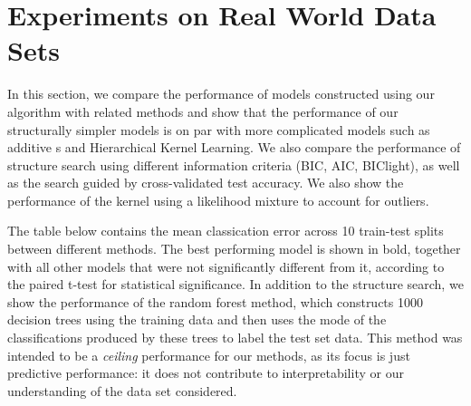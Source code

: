 \documentclass[a4paper,12pt ]{report}
\begin{document}
 \clearpage



\section{Experiments on Real World Data Sets}

In this section, we compare the performance of models constructed using our algorithm with related methods and show that the performance of our structurally simpler models is on par with more complicated models such as additive \gp{}s \cite{duvenaud2011additive11} and Hierarchical Kernel Learning. 
We also compare the performance of structure search using different information criteria (BIC, AIC, BIClight), as well as the search guided by cross-validated test accuracy. We also show the performance of the kernel using a likelihood mixture to account for outliers. 

The table below contains the mean classication error across 10 train-test splits between different methods. The best performing model is shown in bold, together with all other models that were not significantly different from it, according to the paired t-test for statistical significance. In
addition to the structure search, we show the performance of the random forest method, which constructs 1000 decision trees using the training data and then uses the mode of the classifications produced by these trees to label the test set data. This method was intended to be a \emph{ceiling}
performance for our methods, as its focus is just predictive performance: it does not contribute to interpretability or our understanding of the data set considered. 
\end{document}
